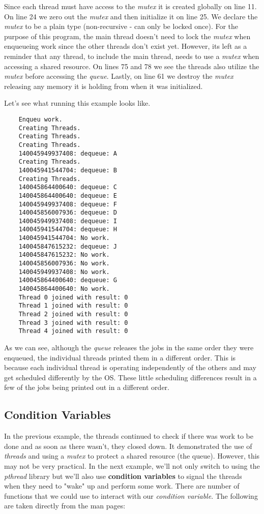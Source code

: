 \documentclass[../main.tex]{subfiles}
\begin{document}
	Since each thread must have access to the \textit{mutex} it is created globally on line 11.  On line 24 we zero out the \textit{mutex} and then initialize it on line 25.  We declare the \textit{mutex} to be a plain type (non-recursive - can only be locked once).  For the purpose of this program, the main thread doesn't need to lock the \textit{mutex} when enqueueing work since the other threads don't exist yet.  However, its left as a reminder that any thread, to include the main thread, needs to use a \textit{mutex} when accessing a shared resource.  On lines 75 and 78 we see the threads also utilize the \textit{mutex} before accessing the \textit{queue}.  Lastly, on line 61 we destroy the \textit{mutex} releasing any memory it is holding from when it was initialized.
	
	Let's see what running this example looks like.
	
	\begin{verbatim}
	Enqueu work.
	Creating Threads.
	Creating Threads.
	Creating Threads.
	140045949937408: dequeue: A
	Creating Threads.
	140045941544704: dequeue: B
	Creating Threads.
	140045864400640: dequeue: C
	140045864400640: dequeue: E
	140045949937408: dequeue: F
	140045856007936: dequeue: D
	140045949937408: dequeue: I
	140045941544704: dequeue: H
	140045941544704: No work.
	140045847615232: dequeue: J
	140045847615232: No work.
	140045856007936: No work.
	140045949937408: No work.
	140045864400640: dequeue: G
	140045864400640: No work.
	Thread 0 joined with result: 0
	Thread 1 joined with result: 0
	Thread 2 joined with result: 0
	Thread 3 joined with result: 0
	Thread 4 joined with result: 0
	\end{verbatim}
	
	As we can see, although the \textit{queue} releases the jobs in the same order they were enqueued, the individual threads printed them in a different order.  This is because each individual thread is operating independently of the others and may get scheduled differently by the OS.  These little scheduling differences result in a few of the jobs being printed out in a different order.
	
	\subsection{Condition Variables}
	
	In the previous example, the threads continued to check if there was work to be done and as soon as there wasn't, they closed down.  It demonstrated the use of \textit{threads} and using a \textit{mutex} to protect a shared resource (the queue).  However, this may not be very practical.  In the next example, we'll not only switch to using the \textit{pthread} library but we'll also use \textbf{condition variables} to signal the threads when they need to "wake" up and perform some work.  There are number of functions that we could use to interact with our \textit{condition variable}.  The following are taken directly from the man pages:
	
\end{document}
